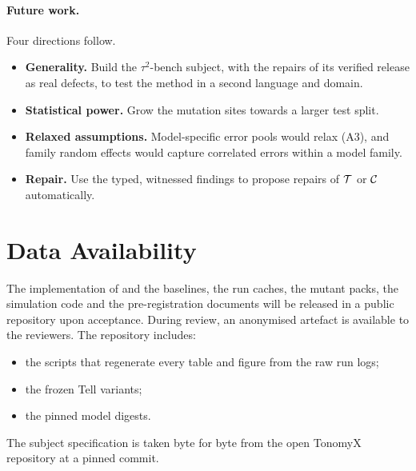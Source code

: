 \paragraph{Future work.} Four directions follow.
\begin{itemize}[leftmargin=*]
\item \textbf{Generality.} Build the $\tau^2$-bench subject, with the repairs of its verified release as real defects, to test the method in a second language and domain.
\item \textbf{Statistical power.} Grow the mutation sites towards a larger test split.
\item \textbf{Relaxed assumptions.} Model-specific error pools would relax (A3), and family random effects would capture correlated errors within a model family.
\item \textbf{Repair.} Use the typed, witnessed findings to propose repairs of $\mathcal{T}$ or $\mathcal{C}$ automatically.
\end{itemize}

\section*{Data Availability}
The implementation of \specdx and the baselines, the run caches, the mutant packs, the simulation code and the pre-registration documents will be released in a public repository upon acceptance. During review, an anonymised artefact is available to the reviewers. The repository includes:
\begin{itemize}[leftmargin=*]
\item the scripts that regenerate every table and figure from the raw run logs;
\item the frozen Tell variants;
\item the pinned model digests.
\end{itemize}
The subject specification is taken byte for byte from the open TonomyX repository at a pinned commit.
